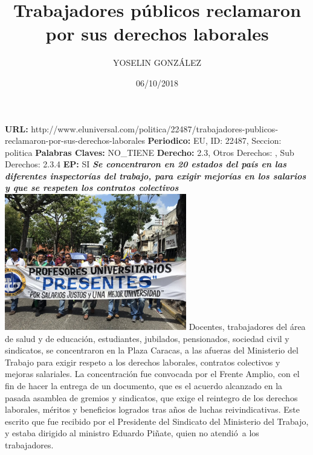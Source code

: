 \documentclass{article}%
\title{\textbf{Trabajadores públicos reclamaron por sus derechos laborales}}%
\author{YOSELIN GONZÁLEZ}%
\date{06/10/2018}%
\begin{document}
%
\normalsize%
\maketitle%
\textbf{URL: }%
http://www.eluniversal.com/politica/22487/trabajadores{-}publicos{-}reclamaron{-}por{-}sus{-}derechos{-}laborales\newline%
%
\textbf{Periodico: }%
EU, %
ID: %
22487, %
Seccion: %
politica\newline%
%
\textbf{Palabras Claves: }%
NO\_TIENE\newline%
%
\textbf{Derecho: }%
2.3, %
Otros Derechos: %
, %
Sub Derechos: %
2.3.4\newline%
%
\textbf{EP: }%
SI\newline%
\newline%
%
\textbf{\textit{Se concentraron en 20 estados del país en las diferentes inspectorías del trabajo, para exigir mejorías en los salarios y que se respeten los contratos colectivos}}%
\newline%
\newline%
%
\includegraphics[width=300px]{43.jpg}%
\newline%
%
Docentes, trabajadores del área de salud y de educación, estudiantes, jubilados, pensionados, sociedad civil y sindicatos, se concentraron en la Plaza Caracas, a las afueras del Ministerio del Trabajo para exigir respeto a los derechos laborales, contratos colectivos y mejoras salariales.%
\newline%
%
La concentración fue convocada por el Frente Amplio, con el fin de hacer la entrega de un documento, que es el acuerdo alcanzado en la pasada asamblea de gremios y sindicatos, que exige el reintegro de los derechos laborales, méritos y beneficios logrados tras años de luchas reivindicativas.%
\newline%
%
Este escrito que fue recibido por el Presidente del Sindicato del Ministerio del Trabajo, y estaba dirigido al ministro Eduardo Piñate, quien no atendió~a los trabajadores.%
\end{document}
